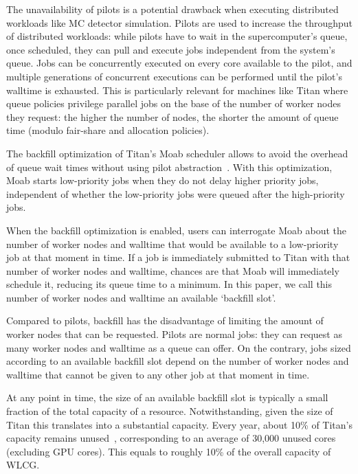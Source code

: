 The unavailability of pilots is a potential drawback when executing
distributed workloads like MC detector simulation. Pilots are used to
increase the throughput of distributed workloads: while pilots have to wait
in the supercomputer's queue, once scheduled, they can pull and execute jobs
independent from the system's queue. Jobs can be concurrently executed on
every core available to the pilot, and multiple generations of concurrent
executions can be performed until the pilot's walltime is exhausted. This is
particularly relevant for machines like Titan where queue policies privilege
parallel jobs on the base of the number of worker nodes they request: the
higher the number of nodes, the shorter the amount of queue time (modulo
fair-share and allocation policies).

The backfill optimization of Titan's Moab scheduler allows to avoid the
overhead of queue wait times without using pilot
abstraction~\cite{maui_backfill_url}. With this optimization, Moab starts
low-priority jobs when they do not delay higher priority jobs, independent of
whether the low-priority jobs were queued after the high-priority jobs.

When the backfill optimization is enabled, users can interrogate Moab about
the number of worker nodes and walltime that would be available to a
low-priority job at that moment in time. If a job is immediately submitted to
Titan with that number of worker nodes and walltime, chances are that Moab
will immediately schedule it, reducing its queue time to a minimum. In this
paper, we call this number of worker nodes and walltime an available
`backfill slot'.

Compared to pilots, backfill has the disadvantage of limiting the amount of
worker nodes that can be requested. Pilots are normal jobs: they can request
as many worker nodes and walltime as a queue can offer. On the contrary, jobs
sized according to an available backfill slot depend on the number of worker
nodes and walltime that cannot be given to any other job at that moment in
time.

At any point in time, the size of an available backfill slot is typically a
small fraction of the total capacity of a resource. Notwithstanding, given
the size of Titan this translates into a substantial capacity. Every year,
about 10\% of Titan's capacity remains unused~\cite{barker2016us},
corresponding to an average of 30,000 unused cores (excluding GPU cores).
This equals to roughly 10\% of the overall capacity of WLCG.


